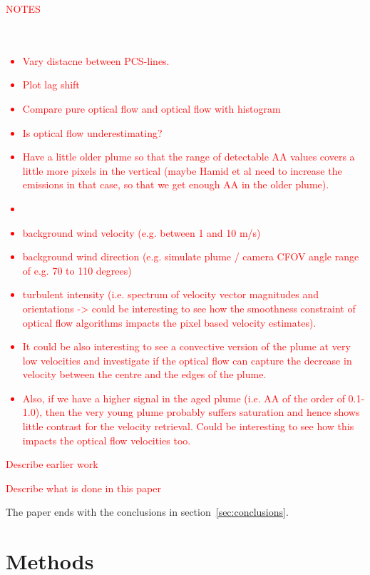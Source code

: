 \documentclass[amtd, manuscript]{copernicus}
\begin{document}
\textcolor{red}{
  NOTES\\
  \\
  \\
  \begin{itemize}
  \item
    Vary distacne between PCS-lines.
  \item
    Plot lag shift
  \item
    Compare pure optical flow and optical flow with histogram
  \item
    Is  optical flow underestimating?
\item Have a little older plume so that the
  range of detectable AA values covers a little more pixels in the
  vertical (maybe Hamid et al need to increase the emissions in that
  case, so that we get enough AA in the older plume).
\item
\item background wind velocity (e.g. between 1 and 10 m/s)
\item background wind direction (e.g. simulate plume / camera CFOV
  angle range of e.g. 70 to 110 degrees)
\item turbulent intensity (i.e. spectrum of velocity vector
  magnitudes and orientations -> could be interesting to see how the
  smoothness constraint of optical flow algorithms impacts the pixel
  based velocity estimates).
\item It could be also interesting to see a convective version of
  the plume at very low velocities and investigate if the optical
  flow can capture the decrease in velocity between the centre and
  the edges of the plume.
\item Also, if we have a higher signal in the aged plume (i.e. AA of the
  order of 0.1-1.0), then the very young plume probably suffers
  saturation and hence shows little contrast for the velocity
  retrieval. Could be interesting to see how this impacts the optical
  flow velocities too.
\end{itemize}
}

\introduction
\textcolor{red}{Describe earlier work}


\textcolor{red}{Describe what is done in this paper}


The paper ends with the conclusions in section~\ref{sec:conclusions}.


\section{Methods}
\label{sec:Methods}
\end{document}
